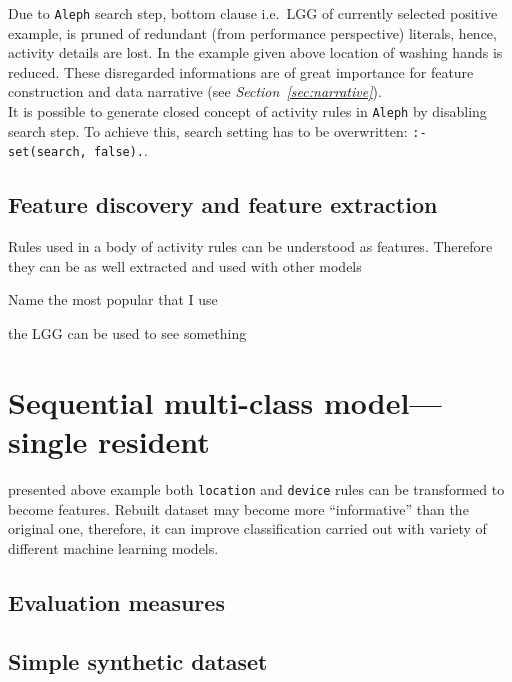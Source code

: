 \documentclass[12pt, a4paper, pdflatex, leqno, twoside, openright]{report}
\begin{document}
Due to \texttt{Aleph} search step, bottom clause i.e.\ LGG of currently selected positive example, is pruned of redundant (from performance perspective) literals, hence, activity details are lost. In the example given above location of washing hands is reduced. These disregarded informations are of great importance for feature construction and data narrative (see \emph{Section~\ref{sec:narrative}}).\\

It is possible to generate closed concept of activity rules in \texttt{Aleph} by disabling search step. To achieve this, search setting has to be overwritten: \texttt{:- set(search, false).}.

  \section{Feature discovery and feature extraction}
Rules used in a body of activity rules can be understood as features.
Therefore they can be as well extracted and used with other models

Name the most popular that I use

the LGG can be used to see something


\chapter{Sequential multi-class model---single resident\label{ch:smcm}}
presented above example both \texttt{location} and \texttt{device} rules can be transformed to become features. Rebuilt dataset may become more ``informative'' than the original one, therefore, it can improve classification carried out with variety of different machine learning models.

  \section{Evaluation measures}
  \section{Simple synthetic dataset}
\end{document}
